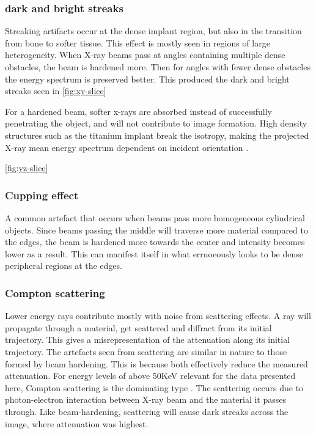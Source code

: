 \subsubsection{dark and bright streaks}

Streaking artifacts occur at the dense implant region, but also in the transition from bone to softer
tissue. This effect is mostly seen in regions of large heterogeneity. When X-ray beams pass at angles
containing multiple dense obstacles, the beam is hardened more. Then for angles with fewer dense
obstacles the energy spectrum is preserved better. This produced the dark and bright streaks seen in
\cref{fig:xy-slice}

For a hardened beam, softer x-rays are absorbed instead of successfully penetrating the object,
and will not contribute to image formation. High density structures such as the titanium implant
break the isotropy, making the projected X-ray mean energy spectrum dependent on incident orientation
\citep{srnoise}.

\cref{fig:yz-slice}

\subsubsection{Cupping effect}

A common artefact that occurs when beams pass more homogeneous cylindrical objects. Since beams
passing the middle will traverse more material compared to the edges, the beam is hardened more
towards the center and intensity becomes lower as a result. This can manifest itself in what
errnoeously looks to be dense peripheral regions at the edges.

\subsubsection{Compton scattering}

Lower energy rays contribute mostly with noise from scattering effects. A ray will propagate through a
material, get scattered and diffract from its initial trajectory. This gives a misrepresentation of
the attenuation along its initial trajectory. The artefacts seen from scattering are similar in
nature to those formed by beam hardening. This is because both effectively reduce the measured
attenuation. For energy levels of above 50KeV relevant for the data presented here, Compton
scattering is the dominating type \citep{compton}. The scattering occurs due to photon-electron
interaction between X-ray beam and the material it passes through. Like beam-hardening, scattering
will cause dark streaks across the image, where attenuation was highest.


